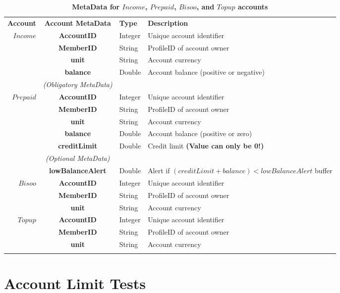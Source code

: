 \begin{table}[H]
\begin{centering}
\small
{
\begin{tabular}{ r | c | l | l }
\textbf{Account}	& {\bf Account MetaData} & {\bf Type} & {\bf Description} \\
\Xhline{1.5pt}
$Income$ 		& {\bf AccountID}			&Integer	& Unique account identifier \\
			& {\bf MemberID}			&String	& ProfileID of account owner \\
			& {\bf unit}					&String	& Account currency \\
			& {\bf balance}				&Double	& Account balance (positive or negative) \\
\Xhline{1.5pt}
			 & \emph{(Obligatory MetaData)}& & \\
\cline{2-2}
$Prepaid$ 	& {\bf AccountID}			&Integer	& Unique account identifier \\
			& {\bf MemberID}			&String	& ProfileID of account owner \\
			& {\bf unit}					&String	& Account currency \\
			& {\bf balance}				&Double	& Account balance (positive or zero) \\
			& {\bf creditLimit}			&Double	& Credit limit {\bf (Value can only be 0!)} \\
\cline{2-2}
			 & \emph{(Optional MetaData)}& & \\
\cline{2-2}
			& {\bf lowBalanceAlert}		&Double	& Alert if $(creditLimit + balance) < lowBalanceAlert$ buffer \\
\Xhline{1.5pt}
$Bisoo$ 		& {\bf AccountID}			&Integer	& Unique account identifier \\
			& {\bf MemberID}			&String	& ProfileID of account owner \\
			& {\bf unit}					&String	& Account currency \\
\Xhline{1.5pt}
$Topup$ 		& {\bf AccountID}			&Integer	& Unique account identifier \\
			& {\bf MemberID}			&String	& ProfileID of account owner \\
			& {\bf unit}					&String	& Account currency \\
\Xhline{1.5pt}
\end{tabular}
}
\caption{\small\textbf{MetaData for $Income$, $Prepaid$, $Bisoo$, and $Topup$ accounts}}
\label{tab:AccountMetaData2}
\end{centering}
\end{table}















\section{Account Limit Tests}












